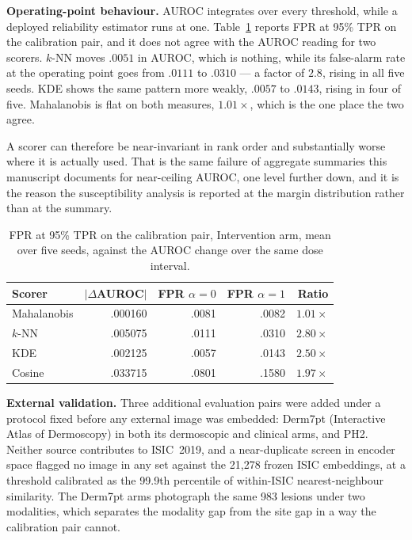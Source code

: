 \documentclass[11pt,a4paper]{article}
\begin{document}
\textbf{Operating-point behaviour.} AUROC integrates over every threshold,
while a deployed reliability estimator runs at one. Table~\ref{tab:fpr} reports
FPR at 95\% TPR on the calibration pair, and it does not agree with the AUROC
reading for two scorers. $k$-NN moves $.0051$ in AUROC, which is nothing, while
its false-alarm rate at the operating point goes from $.0111$ to $.0310$ --- a
factor of $2.8$, rising in all five seeds. KDE shows the same pattern more
weakly, $.0057$ to $.0143$, rising in four of five. Mahalanobis is flat on both
measures, $1.01\times$, which is the one place the two agree.

A scorer can therefore be near-invariant in rank order and substantially worse
where it is actually used. That is the same failure of aggregate summaries this
manuscript documents for near-ceiling AUROC, one level further down, and it is
the reason the susceptibility analysis is reported at the margin distribution
rather than at the summary.

\begin{table}[t]
\centering
\caption{FPR at 95\% TPR on the calibration pair, Intervention arm, mean over five seeds, against the AUROC change over the same dose interval.}
\label{tab:fpr}
\small
\begin{tabular}{lrrrr}
\toprule
Scorer & $|\Delta$AUROC$|$ & FPR $\alpha{=}0$ & FPR $\alpha{=}1$ & Ratio\\
\midrule
Mahalanobis & .000160 & .0081 & .0082 & $1.01\times$\\
$k$-NN & .005075 & .0111 & .0310 & $2.80\times$\\
KDE & .002125 & .0057 & .0143 & $2.50\times$\\
Cosine & .033715 & .0801 & .1580 & $1.97\times$\\
\bottomrule
\end{tabular}
\end{table}

\label{sec:external}
\textbf{External validation.} Three additional evaluation pairs were added under a protocol fixed before any external image was embedded: Derm7pt (Interactive Atlas of Dermoscopy) in both its dermoscopic and clinical arms, and PH2. Neither source contributes to ISIC~2019, and a near-duplicate screen in encoder space flagged no image in any set against the 21{,}278 frozen ISIC embeddings, at a threshold calibrated as the 99.9th percentile of within-ISIC nearest-neighbour similarity. The Derm7pt arms photograph the same 983 lesions under two modalities, which separates the modality gap from the site gap in a way the calibration pair cannot.
\end{document}
